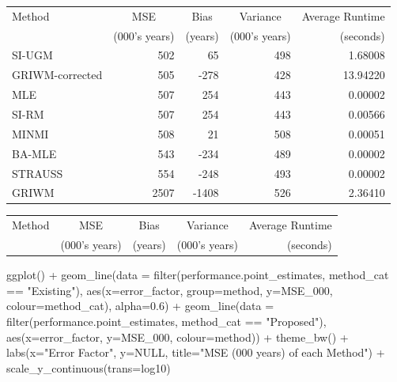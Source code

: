 \documentclass[
]{article}
\newenvironment{Shaded}{\begin{snugshade}}{\end{snugshade}}
\newcommand{\AttributeTok}[1]{\textcolor[rgb]{0.77,0.63,0.00}{#1}}
\newcommand{\ConstantTok}[1]{\textcolor[rgb]{0.00,0.00,0.00}{#1}}
\newcommand{\FloatTok}[1]{\textcolor[rgb]{0.00,0.00,0.81}{#1}}
\newcommand{\FunctionTok}[1]{\textcolor[rgb]{0.00,0.00,0.00}{#1}}
\newcommand{\NormalTok}[1]{#1}
\newcommand{\SpecialCharTok}[1]{\textcolor[rgb]{0.00,0.00,0.00}{#1}}
\newcommand{\StringTok}[1]{\textcolor[rgb]{0.31,0.60,0.02}{#1}}
\begin{document}
\begin{tabular}{lrrrr}
\toprule
\multicolumn{1}{l}{Method} & \multicolumn{1}{c}{MSE} & \multicolumn{1}{c}{Bias} & \multicolumn{1}{c}{Variance} & \multicolumn{1}{c}{Average Runtime} \\
 & (000's years) & (years) & (000's years) & (seconds)\\
\midrule
SI-UGM & 502 & 65 & 498 & 1.68008\\
GRIWM-corrected & 505 & -278 & 428 & 13.94220\\
MLE & 507 & 254 & 443 & 0.00002\\
SI-RM & 507 & 254 & 443 & 0.00566\\
MINMI & 508 & 21 & 508 & 0.00051\\
\addlinespace
BA-MLE & 543 & -234 & 489 & 0.00002\\
STRAUSS & 554 & -248 & 493 & 0.00002\\
GRIWM & 2507 & -1408 & 526 & 2.36410\\
\bottomrule
\end{tabular}

\begin{tabular}{lrrrr}
\toprule
\multicolumn{1}{l}{Method} & \multicolumn{1}{c}{MSE} & \multicolumn{1}{c}{Bias} & \multicolumn{1}{c}{Variance} & \multicolumn{1}{c}{Average Runtime} \\
 & (000's years) & (years) & (000's years) & (seconds)\\


\bottomrule
\end{tabular}

\begin{Shaded}
\begin{Highlighting}[]
\FunctionTok{ggplot}\NormalTok{() }\SpecialCharTok{+}
  \FunctionTok{geom\_line}\NormalTok{(}\AttributeTok{data =} \FunctionTok{filter}\NormalTok{(performance.point\_estimates, method\_cat }\SpecialCharTok{==} \StringTok{"Existing"}\NormalTok{),}
            \FunctionTok{aes}\NormalTok{(}\AttributeTok{x=}\NormalTok{error\_factor, }\AttributeTok{group=}\NormalTok{method, }\AttributeTok{y=}\NormalTok{MSE\_000, }\AttributeTok{colour=}\NormalTok{method\_cat), }\AttributeTok{alpha=}\FloatTok{0.6}\NormalTok{) }\SpecialCharTok{+}
  \FunctionTok{geom\_line}\NormalTok{(}\AttributeTok{data =} \FunctionTok{filter}\NormalTok{(performance.point\_estimates, method\_cat }\SpecialCharTok{==} \StringTok{"Proposed"}\NormalTok{),}
            \FunctionTok{aes}\NormalTok{(}\AttributeTok{x=}\NormalTok{error\_factor, }\AttributeTok{y=}\NormalTok{MSE\_000, }\AttributeTok{colour=}\NormalTok{method)) }\SpecialCharTok{+}
  \FunctionTok{theme\_bw}\NormalTok{() }\SpecialCharTok{+}
  \FunctionTok{labs}\NormalTok{(}\AttributeTok{x=}\StringTok{"Error Factor"}\NormalTok{, }\AttributeTok{y=}\ConstantTok{NULL}\NormalTok{, }\AttributeTok{title=}\StringTok{"MSE (\textquotesingle{}000 years) of each Method"}\NormalTok{) }\SpecialCharTok{+}
  \FunctionTok{scale\_y\_continuous}\NormalTok{(}\AttributeTok{trans=}\StringTok{\textquotesingle{}log10\textquotesingle{}}\NormalTok{)}
\end{Highlighting}
\end{Shaded}
\end{document}
